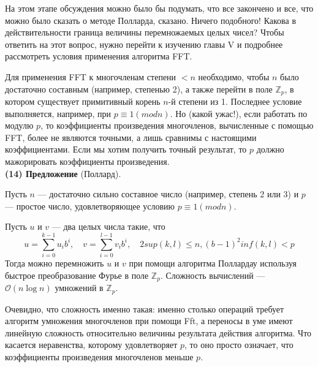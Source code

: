 \documentclass{mai_book}
\begin{document}
На этом этапе обсуждения можно было бы подумать, что все 
закончено и все, что можно было сказать о методе Полларда, сказано. Ничего
подобного! Какова в действительности граница величины 
перемножаемых целых чисел? Чтобы ответить на этот вопрос, нужно перейти к
изучению главы V и подробнее рассмотреть условия применения 
алгоритма FFT. \par
 Для применения FFT к многочленам степени $< n$ необходимо, чтобы
$n$ было достаточно составным (например, степенью 2), а также 
перейти в поле $\mathbb{Z}_p$, в котором существует примитивный корень $n$-й степени из 1. Последнее условие выполняется, например, при $p \equiv 1 (mod n)$. Но (какой ужас!), если работать по модулю $p$, то коэффициенты 
произведения многочленов, вычисленные с помощью FFT, более не являются
точными, а лишь сравнимы с настоящими коэффициентами. Если мы
хотим получить точный результат, то $p$ должно мажорировать 
коэффициенты произведения. \\
\textbf{(14) Предложение} (Поллард). \\ 
\par
Пусть $n$ — достаточно сильно составное число (например, степень 2
или 3) и $p$ — простое число, удовлетворяющее условию $p \equiv 1 (mod n)$. 
\pagebreak
\newpage

Пусть $u$ и $v$ — два целых числа такие, что
$$u = \sum\limits^{k-1}_{i = 0}u_{i}b^{i},\quad v = \sum\limits^{l-1}_{i = 0}v_{i}b^{i},\quad 2sup(k,l) \leq n, (b - 1)^{2}inf(k, l) < p$$
Тогда можно перемножить $u$ и $v$ при помощи алгоритма Поллардау 
используя быстрое преобразование Фурье в поле $\mathbb{Z}_p$. Сложность 
вычислений --- $\mathcal{O}(n\log{}n)$  умножений в $\mathbb{Z}_p$.\par
Очевидно, что сложность именно такая: именно столько операций
требует алгоритм умножения многочленов при помощи Fft, а 
переносы в уме имеют линейную сложность относительно величины 
результата действия алгоритма. Что касается неравенства, которому 
удовлетворяет $p$, то оно просто означает, что коэффициенты произведения
многочленов меньше $p$. 
\end{document}
